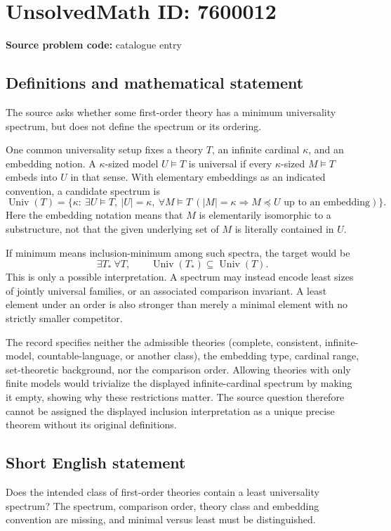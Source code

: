 \documentclass[11pt]{article}
\begin{document}
\section*{UnsolvedMath ID: 7600012}
\textbf{Source problem code:} catalogue entry
\subsection{Definitions and mathematical statement}
The source asks whether some first-order theory has a minimum universality spectrum, but does not define the spectrum or its ordering.

One common universality setup fixes a theory $T$, an infinite cardinal $\kappa$, and an embedding notion. A $\kappa$-sized model $U\models T$ is universal if every $\kappa$-sized $M\models T$ embeds into $U$ in that sense. With elementary embeddings as an indicated convention, a candidate spectrum is
\[
\operatorname{Univ}(T)=\{\kappa:\ \exists U\models T,\ |U|=\kappa,
\ \forall M\models T\ (|M|=\kappa\Rightarrow M\preccurlyeq U\text{ up to an embedding})\}.
\]
Here the embedding notation means that $M$ is elementarily isomorphic to a substructure, not that the given underlying set of $M$ is literally contained in $U$.

If minimum means inclusion-minimum among such spectra, the target would be
\[
\exists T_*\ \forall T,\qquad\operatorname{Univ}(T_*)\subseteq\operatorname{Univ}(T).
\]
This is only a possible interpretation. A spectrum may instead encode least sizes of jointly universal families, or an associated comparison invariant. A least element under an order is also stronger than merely a minimal element with no strictly smaller competitor.

The record specifies neither the admissible theories (complete, consistent, infinite-model, countable-language, or another class), the embedding type, cardinal range, set-theoretic background, nor the comparison order. Allowing theories with only finite models would trivialize the displayed infinite-cardinal spectrum by making it empty, showing why these restrictions matter. The source question therefore cannot be assigned the displayed inclusion interpretation as a unique precise theorem without its original definitions.
\subsection{Short English statement}
Does the intended class of first-order theories contain a least universality spectrum? The spectrum, comparison order, theory class and embedding convention are missing, and minimal versus least must be distinguished.
\end{document}
